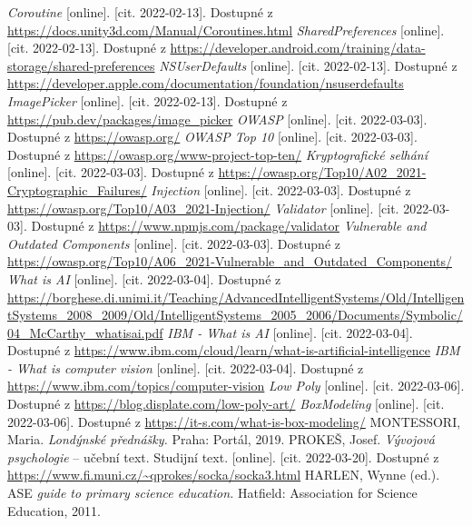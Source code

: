 \begin{thebibliography}{99}
     \textit{Coroutine} [online]. [cit. 2022-02-13]. Dostupné z \url{https://docs.unity3d.com/Manual/Coroutines.html}
     \textit{SharedPreferences} [online]. [cit. 2022-02-13]. Dostupné z \url{https://developer.android.com/training/data-storage/shared-preferences}
     \textit{NSUserDefaults} [online]. [cit. 2022-02-13]. Dostupné z \url{https://developer.apple.com/documentation/foundation/nsuserdefaults}
     \textit{ImagePicker} [online]. [cit. 2022-02-13]. Dostupné z \url{https://pub.dev/packages/image_picker}
     \textit{OWASP} [online]. [cit. 2022-03-03]. Dostupné z \url{https://owasp.org/}
     \textit{OWASP Top 10} [online]. [cit. 2022-03-03]. Dostupné z \url{https://owasp.org/www-project-top-ten/}
     \textit{Kryptografické selhání} [online]. [cit. 2022-03-03]. Dostupné z \url{https://owasp.org/Top10/A02_2021-Cryptographic_Failures/}
     \textit{Injection} [online]. [cit. 2022-03-03]. Dostupné z \url{https://owasp.org/Top10/A03_2021-Injection/}
     \textit{Validator} [online]. [cit. 2022-03-03]. Dostupné z \url{https://www.npmjs.com/package/validator}
     \textit{Vulnerable and Outdated Components} [online]. [cit. 2022-03-03]. Dostupné z \url{https://owasp.org/Top10/A06_2021-Vulnerable_and_Outdated_Components/}
     \textit{What is AI} [online]. [cit. 2022-03-04]. Dostupné z \url{https://borghese.di.unimi.it/Teaching/AdvancedIntelligentSystems/Old/IntelligentSystems_2008_2009/Old/IntelligentSystems_2005_2006/Documents/Symbolic/04_McCarthy_whatisai.pdf}
     \textit{IBM - What is AI} [online]. [cit. 2022-03-04]. Dostupné z \url{https://www.ibm.com/cloud/learn/what-is-artificial-intelligence}
     \textit{IBM - What is computer vision} [online]. [cit. 2022-03-04]. Dostupné z \url{https://www.ibm.com/topics/computer-vision}
     \textit{Low Poly} [online]. [cit. 2022-03-06]. Dostupné z \url{https://blog.displate.com/low-poly-art/}
     \textit{BoxModeling} [online]. [cit. 2022-03-06]. Dostupné z \url{https://it-s.com/what-is-box-modeling/}
     MONTESSORI, Maria. \textit{Londýnské přednášky.}  Praha: Portál, 2019.
      PROKEŠ, Josef. \textit{Vývojová psychologie} – učební text. Studijní text. [online]. [cit. 2022-03-20]. Dostupné z \url{https://www.fi.muni.cz/~qprokes/socka/socka3.html}
     HARLEN, Wynne (ed.). ASE \textit{guide to primary science education.} Hatfield: Association for Science Education, 2011.
\end{thebibliography}